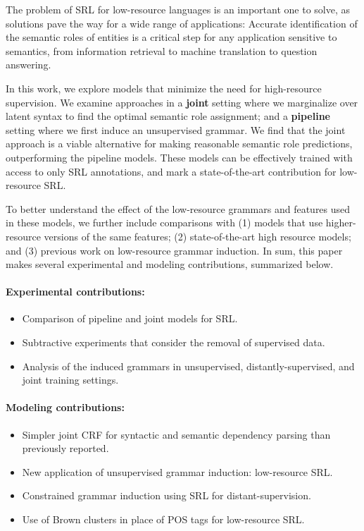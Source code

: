 \documentclass[11pt]{article}
\begin{document}
The problem of SRL for low-resource languages is an important one
to solve, as solutions pave the way for a wide range of applications:  
Accurate identification of the semantic roles of entities is a critical step
for any application sensitive to semantics, from information retrieval to machine translation to
question answering.  

In this work, we explore models that minimize the need for high-resource
supervision.  We examine approaches in a {\bf joint} setting where we marginalize
over latent syntax to find the optimal semantic role assignment; and a {\bf
  pipeline} setting where we first induce an unsupervised grammar.  We find that the joint approach is a viable alternative for making 
reasonable semantic role predictions, outperforming the pipeline
models. These models can be effectively trained with access to 
only SRL annotations, and mark a state-of-the-art contribution for low-resource SRL.

To better understand the effect of the low-resource grammars and features used in these models, we further include comparisons with (1) models that use higher-resource versions of the same features; (2) state-of-the-art high resource models; and (3) previous work on low-resource grammar induction.  In sum, this paper makes several experimental and modeling contributions, summarized below.

\paragraph{Experimental contributions:}
\begin{itemize}
\vspace{-.5em}
\itemsep -.25em
\item Comparison of pipeline and joint models for SRL. 
\item Subtractive experiments that consider the removal of supervised data.
\item Analysis of the induced grammars in unsupervised, distantly-supervised, and joint training settings.
\end{itemize}

\paragraph{Modeling contributions:}
\begin{itemize}
\vspace{-.5em}
\itemsep -.25em
\item Simpler joint CRF for syntactic and semantic dependency parsing than previously reported.
\item New application of unsupervised grammar induction: low-resource SRL.
\item Constrained grammar induction using SRL for distant-supervision.
\item Use of Brown clusters in place of POS tags for low-resource SRL.
\end{itemize}
\end{document}
